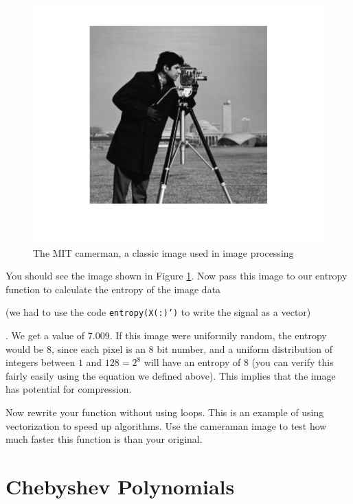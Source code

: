 \begin{figure}[h!]
\begin{center}
\includegraphics{./Figures/CameramanClean.pdf}
\end{center}
\caption{The MIT camerman, a classic image used in image processing}
\label{fig:cameramanclean}
\end{figure}
You should see the image shown in Figure \ref{fig:cameramanclean}. Now pass this image to our entropy function to calculate the entropy of the image data \begin{matlab}(we had to use the code {\tt entropy(X(:)')} to write the signal as a vector)\end{matlab}. We get a value of $7.009$. If this image were uniformily random, the entropy would be $8$, since each pixel is an $8$ bit number, and a uniform distribution of integers between $1$ and $128 = 2^8$ will have an entropy of $8$ (you can verify this fairly easily using the equation we defined above). This implies that the image has potential for compression.

\begin{problem}
Now rewrite your function without using loops. This is an example of using vectorization to speed up algorithms. Use the cameraman image to test how much faster this function is than your original.
\end{problem}

\section*{Chebyshev Polynomials}

